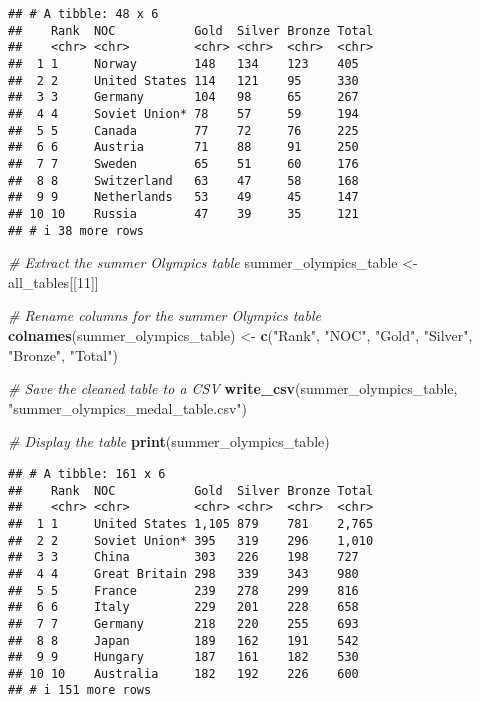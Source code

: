 \documentclass[
]{article}
\newenvironment{Shaded}{\begin{snugshade}}{\end{snugshade}}
\newcommand{\CommentTok}[1]{\textcolor[rgb]{0.56,0.35,0.01}{\textit{#1}}}
\newcommand{\DecValTok}[1]{\textcolor[rgb]{0.00,0.00,0.81}{#1}}
\newcommand{\FunctionTok}[1]{\textcolor[rgb]{0.13,0.29,0.53}{\textbf{#1}}}
\newcommand{\NormalTok}[1]{#1}
\newcommand{\OtherTok}[1]{\textcolor[rgb]{0.56,0.35,0.01}{#1}}
\newcommand{\StringTok}[1]{\textcolor[rgb]{0.31,0.60,0.02}{#1}}
\begin{document}
\begin{verbatim}
## # A tibble: 48 x 6
##    Rank  NOC           Gold  Silver Bronze Total
##    <chr> <chr>         <chr> <chr>  <chr>  <chr>
##  1 1     Norway        148   134    123    405  
##  2 2     United States 114   121    95     330  
##  3 3     Germany       104   98     65     267  
##  4 4     Soviet Union* 78    57     59     194  
##  5 5     Canada        77    72     76     225  
##  6 6     Austria       71    88     91     250  
##  7 7     Sweden        65    51     60     176  
##  8 8     Switzerland   63    47     58     168  
##  9 9     Netherlands   53    49     45     147  
## 10 10    Russia        47    39     35     121  
## # i 38 more rows
\end{verbatim}

\begin{Shaded}
\begin{Highlighting}[]
\CommentTok{\# Extract the summer Olympics table }
\NormalTok{summer\_olympics\_table }\OtherTok{\textless{}{-}}\NormalTok{ all\_tables[[}\DecValTok{11}\NormalTok{]]}

\CommentTok{\# Rename columns for the summer Olympics table}
\FunctionTok{colnames}\NormalTok{(summer\_olympics\_table) }\OtherTok{\textless{}{-}} \FunctionTok{c}\NormalTok{(}\StringTok{"Rank"}\NormalTok{, }\StringTok{"NOC"}\NormalTok{, }\StringTok{"Gold"}\NormalTok{, }\StringTok{"Silver"}\NormalTok{, }\StringTok{"Bronze"}\NormalTok{, }\StringTok{"Total"}\NormalTok{)}

\CommentTok{\# Save the cleaned table to a CSV}
\FunctionTok{write\_csv}\NormalTok{(summer\_olympics\_table, }\StringTok{"summer\_olympics\_medal\_table.csv"}\NormalTok{)}

\CommentTok{\# Display the table}
\FunctionTok{print}\NormalTok{(summer\_olympics\_table)}
\end{Highlighting}
\end{Shaded}

\begin{verbatim}
## # A tibble: 161 x 6
##    Rank  NOC           Gold  Silver Bronze Total
##    <chr> <chr>         <chr> <chr>  <chr>  <chr>
##  1 1     United States 1,105 879    781    2,765
##  2 2     Soviet Union* 395   319    296    1,010
##  3 3     China         303   226    198    727  
##  4 4     Great Britain 298   339    343    980  
##  5 5     France        239   278    299    816  
##  6 6     Italy         229   201    228    658  
##  7 7     Germany       218   220    255    693  
##  8 8     Japan         189   162    191    542  
##  9 9     Hungary       187   161    182    530  
## 10 10    Australia     182   192    226    600  
## # i 151 more rows
\end{verbatim}
\end{document}
